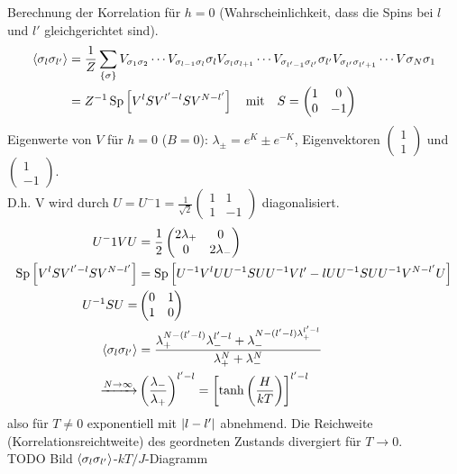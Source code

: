 \begin{enumerate}[A)]
    Berechnung der Korrelation für $h=0$ (Wahrscheinlichkeit, dass die Spins bei $l$ und $l'$ gleichgerichtet sind).
    \begin{equation}
        \begin{split}
            \left\langle\sigma_l \sigma_{l'}\right\rangle &= \frac{1}{Z} \sum_{\left\{ \sigma \right\}} V_{\sigma_1 \sigma_2} \cdots V_{\sigma_{l-1} \sigma_l} \sigma_l V_{\sigma_l \sigma_{l+1}} \cdots V_{\sigma_{l'-1} \sigma_{l'}} \sigma_{l'} V_{\sigma_{l'} \sigma_{l'+1}} \cdots V{\sigma_N \sigma_1} \\
            &= Z^{-1} \operatorname{Sp} \left[ V^l S V^{l'-l} S V^{N-l'} \right] \quad \text{mit} \quad S =
            \begin{pmatrix}
                1 & 0 \\
                0 & - 1
            \end{pmatrix}
        \end{split}
    \end{equation}
	Eigenwerte von $V$ für $h=0$ ($B=0$): $\lambda_\pm = e^K \pm e^{-K}$, Eigenvektoren $\begin{pmatrix} 1 \\ 1 \end{pmatrix}$ und $\begin{pmatrix} 1 \\ -1 \end{pmatrix}$. \\
	D.h. V wird durch $U = U^-1 = \frac{1}{\sqrt{2}} \begin{pmatrix} 1 & 1 \\1 & -1 \end{pmatrix}$ diagonalisiert.
\begin{equation}
    \begin{split}
    U^-1 V U &= \frac{1}{2}
    \begin{pmatrix}
        2 \lambda_+ & 0 \\
        0 & 2 \lambda_-
    \end{pmatrix} \\
    \operatorname{Sp} \left[ V^l S V^{l'-l} S V^{N-l'} \right] &= \operatorname{Sp} \left[ U^{-1} V^l U U^{-1} S U U^{-1} V{l'-l} U U^{-1} S U U ^{-1} V^{N-l'} U \right] \\
    U^{-1} S U=&
    \begin{pmatrix}
        0 & 1 \\
        1 & 0
    \end{pmatrix} \\
    \left\langle\sigma_l \sigma_{l'}\right\rangle &= \frac{\lambda_+^{N-(l'-l)}\lambda_-^{l' - l} + \lambda_-^{N-(l'-l) \lambda_+^{l'-l}}}{\lambda_+^N + \lambda_-^N} \\
    \xrightarrow{N \to \infty}  &\left( \frac{\lambda_-}{\lambda_+} \right)^{l' - l} = \left[ \tanh \left( \frac{H}{k T} \right)  \right]^{l'-l}
    \end{split}
\end{equation}
also für $T \neq 0$ exponentiell mit $\left| l-l' \right|$ abnehmend. Die Reichweite (Korrelationsreichtweite) des geordneten Zustands divergiert für $T \to 0.$ \\
TODO Bild $\left\langle\sigma_l \sigma_{l'}\right\rangle$-$kT/J$-Diagramm
\end{enumerate}
